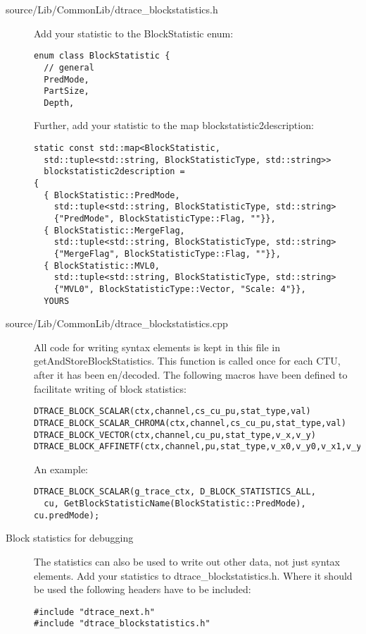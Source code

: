\documentclass[a4paper,11pt]{jvetdoc}
\begin{document}
\begin{description}
\item[source/Lib/CommonLib/dtrace_blockstatistics.h]
  Add your statistic to the BlockStatistic enum:	
\begin{verbatim}
enum class BlockStatistic {
  // general
  PredMode,
  PartSize,
  Depth,
\end{verbatim}
  
Further, add your statistic to the map blockstatistic2description:
\begin{verbatim}
static const std::map<BlockStatistic, 
  std::tuple<std::string, BlockStatisticType, std::string>> 
  blockstatistic2description =
{
  { BlockStatistic::PredMode, 
    std::tuple<std::string, BlockStatisticType, std::string>
    {"PredMode", BlockStatisticType::Flag, ""}},
  { BlockStatistic::MergeFlag,
    std::tuple<std::string, BlockStatisticType, std::string>
    {"MergeFlag", BlockStatisticType::Flag, ""}},
  { BlockStatistic::MVL0,
    std::tuple<std::string, BlockStatisticType, std::string>
    {"MVL0", BlockStatisticType::Vector, "Scale: 4"}},
  YOURS
\end{verbatim}


\item[source/Lib/CommonLib/dtrace_blockstatistics.cpp] All code for
  writing syntax elements is kept in this file in
  getAndStoreBlockStatistics. This function is called once for each
  CTU, after it has been en/decoded. The following macros have been
  defined to facilitate writing of block statistics:
\begin{verbatim}
DTRACE_BLOCK_SCALAR(ctx,channel,cs_cu_pu,stat_type,val)   
DTRACE_BLOCK_SCALAR_CHROMA(ctx,channel,cs_cu_pu,stat_type,val)
DTRACE_BLOCK_VECTOR(ctx,channel,cu_pu,stat_type,v_x,v_y)    
DTRACE_BLOCK_AFFINETF(ctx,channel,pu,stat_type,v_x0,v_y0,v_x1,v_y1,v_x2,v_y2) 
\end{verbatim}

An example:
\begin{verbatim}
DTRACE_BLOCK_SCALAR(g_trace_ctx, D_BLOCK_STATISTICS_ALL, 
  cu, GetBlockStatisticName(BlockStatistic::PredMode), cu.predMode);
\end{verbatim}


\item[Block statistics for debugging] The statistics can also be used
  to write out other data, not just syntax elements. Add your
  statistics to dtrace_blockstatistics.h. Where it should be used the
  following headers have to be included:
\begin{verbatim}
#include "dtrace_next.h"
#include "dtrace_blockstatistics.h"
\end{verbatim}
\end{description}
\end{document}
